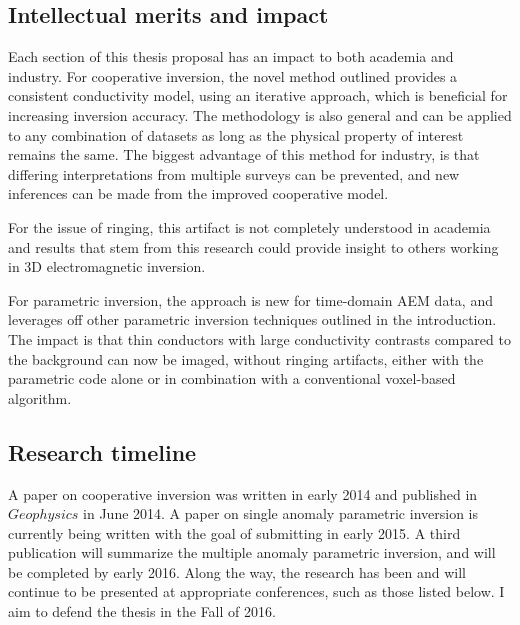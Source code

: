 \documentclass[letterpaper,11pt]{article}
\begin{document}
\subsection{Intellectual merits and impact}
Each section of this thesis proposal has an impact to both academia and industry.  For cooperative inversion, the novel method outlined provides a consistent conductivity model, using an iterative approach, which is beneficial for increasing inversion accuracy. The methodology is also general and can be applied to any combination of datasets as long as the physical property of interest remains the same. The biggest advantage of this method for industry, is that differing interpretations from multiple surveys can be prevented, and new inferences can be made from the improved cooperative model.  

For the issue of ringing, this artifact is not completely understood in academia and results that stem from this research could provide insight to others working in 3D electromagnetic inversion. 

For parametric inversion, the approach is new for time-domain AEM data, and leverages off other parametric inversion techniques outlined in the introduction. The impact is that thin conductors with large conductivity contrasts compared to the background can now be imaged, without ringing artifacts, either with the parametric code alone or in combination with a conventional voxel-based algorithm. 



\subsection{Research timeline}
A paper on cooperative inversion was written in early 2014 and published in $ \mathit{Geophysics} $ in June 2014. A paper on single anomaly parametric inversion is currently being written with the goal of submitting in early 2015. A third publication will summarize the multiple anomaly parametric inversion, and will be completed by early 2016. Along the way, the research has been and will continue to be presented at appropriate conferences, such as those listed below. I aim to defend the thesis in the Fall of 2016.

\newpage
\end{document}
